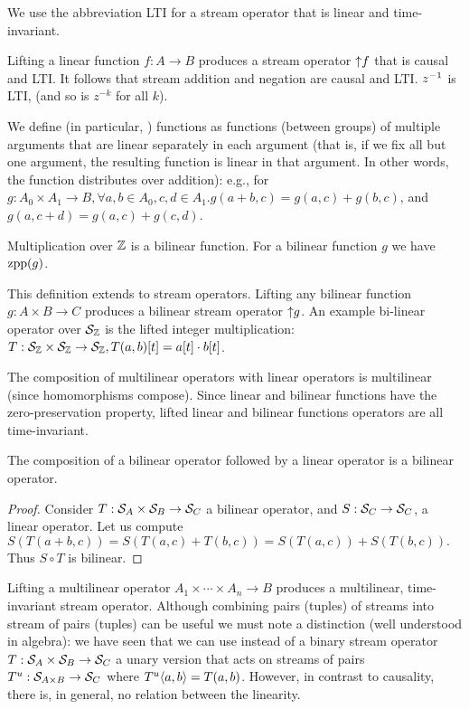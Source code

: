 We use the abbreviation LTI for a stream operator that is linear and time-invariant.

Lifting a linear function $f: A \to B$ produces a stream operator ${\uparrow}f$ that is causal and LTI. 
It follows that stream addition and negation are causal and LTI.
$z^{-1}$ is LTI, (and so is $z^{-k}$ for all $k$).

\begin{definition}
We define  (in particular, ) functions as functions (between groups) of multiple
arguments that are linear separately in each argument (that is, if we fix all but one argument,
the resulting function is linear in that argument.  In other words, the function distributes over addition): 
e.g., for $g: A_0 \times A_1 \to B, \forall a, b \in A_0, c, d \in A_1 . g(a+b, c) = g(a, c) + g(b, c)$, 
and $g(a, c+d) = g(a, c) + g(c, d)$.
\end{definition}

Multiplication over $\mathbb{Z}$ is a bilinear function.  For a bilinear function $g$ we have $\mbox{zpp}(g)$.

This definition extends to stream operators.
Lifting any bilinear function $g: A \times B \to C$ produces a bilinear stream operator ${\uparrow}g$.
An example bi-linear operator over $\mathcal{S}_{\mathbb{Z}}$ is the lifted integer multiplication: 
$T: \mathcal{S}_{\mathbb{Z}} \times \mathcal{S}_{\mathbb{Z}} \to \mathcal{S}_{\mathbb{Z}}, T(a, b)[t] = a[t]\cdot b[t]$.

The composition of multilinear operators with linear operators is multilinear (since homomorphisms compose).
Since linear and bilinear functions have the zero-preservation property,
lifted linear and bilinear functions operators are all time-invariant.

\begin{proposition}
The composition of a bilinear operator followed by a linear operator is a bilinear operator.
\end{proposition}
\begin{proof}
Consider $T: \mathcal{S}_{A} \times \mathcal{S}_{B} \to \mathcal{S}_{C}$ a bilinear operator, and 
$S: \mathcal{S}_{C} \to \mathcal{S}_{C}$, a linear operator.  Let us compute $S(T(a+b, c)) = S(T(a, c) + T(b, c)) = 
S(T(a, c)) + S(T(b, c)).$  Thus $S \circ T$ is bilinear.
\end{proof}

Lifting a multilinear operator $A_1\times\cdots\times A_n \rightarrow B$ produces a multilinear, time-invariant stream operator. Although combining pairs (tuples) of 
streams into stream of pairs (tuples) can be useful
we must note a distinction (well understood in algebra): 
we have seen that we can use instead of a binary stream operator
$T:\mathcal{S}_{A}\times\mathcal{S}_{B}\to\mathcal{S}_{C}$ a unary version that acts on streams of pairs
$T^u:\mathcal{S}_{A\times B}\to\mathcal{S}_{C}$ where $T^u\langle a,b \rangle=T(a,b)$. However, in contrast to causality,
there is, in general, no relation between the linearity. %

